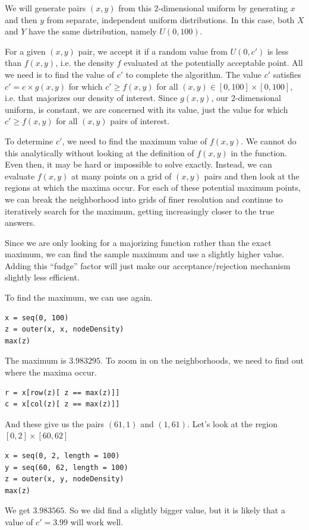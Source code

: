 \documentclass{article}
\begin{document}
\begin{description}
We will generate pairs $(x, y)$ from this 2-dimensional uniform by
generating $x$ and then $y$ from separate, independent uniform
distributions. In this case, both $X$ and $Y$ have the same
distribution, namely $U(0, 100)$.

For a given $(x, y)$ pair, we accept it if a random value from $U(0,
c')$ is less than $f(x, y)$, i.e. the density $f$ evaluated at the
potentially acceptable point.  All we need is to find the value of
$c'$ to complete the algorithm.  The value $c'$ satisfies $c' =
c\times g(x, y)$ for which $c' \ge f(x, y)$ for all $(x, y) \in
[0,100] \times [0, 100]$, i.e. that majorizes our density of interest.
Since $g(x, y)$, our 2-dimensional uniform, is constant, we are
concerned with its value, just the value for which $c' \ge f(x, y)$
for all $(x, y)$ pairs of interest.

To determine $c'$, we need to find the maximum value of $f(x, y)$.  We
cannot do this analytically without looking at the definition of $f(x,
y)$ in the  function. Even then, it may be hard
or impossible to solve exactly.  Instead, we can evaluate $f(x, y)$ at
many points on a grid of $(x, y)$ pairs and then look at the regions
at which the maxima occur.  For each of these potential maximum
points, we can break the neighborhood into grids of finer resolution
and continue to iteratively search for the maximum, getting
increasingly closer to the true answers.

Since we are only looking for a majorizing function rather than the
exact maximum, we can find the sample maximum and use a slightly
higher value.  Adding this ``fudge'' factor will just make our
acceptance/rejection mechanism slightly less efficient.

To find the maximum, we can use
 again.
\begin{verbatim}
x = seq(0, 100)
z = outer(x, x, nodeDensity)
max(z)
\end{verbatim}

The maximum is $ 3.983295$.
To zoom in on the neighborhoods,
we need to find out where the maxima occur.
\begin{verbatim}
r = x[row(z)[ z == max(z)]]
c = x[col(z)[ z == max(z)]]
\end{verbatim}
And these give us 
the pairs
$(61, 1)$ and $(1, 61)$.
Let's look at the region $[0, 2] \times [60, 62]$
\begin{verbatim}
x = seq(0, 2, length = 100)
y = seq(60, 62, length = 100)
z = outer(x, y, nodeDensity)
max(z)
\end{verbatim}
We get $3.983565$.  So we did find a slightly bigger value, but it is
likely that a value of $c' = 3.99$ will work well.


\end{description}
\end{document}
